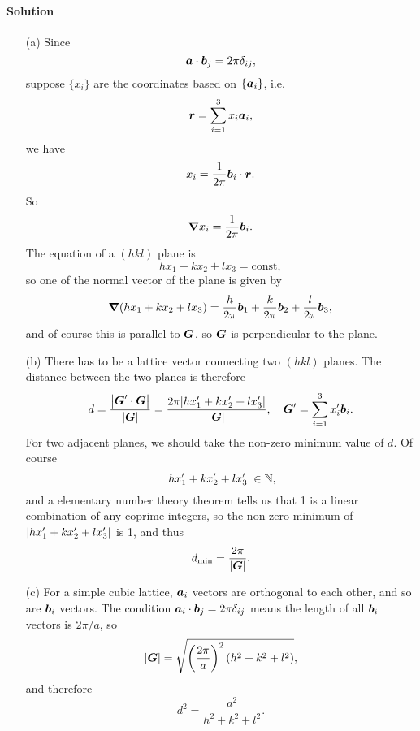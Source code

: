 \documentclass[hyperref, a4paper]{article}
\begin{document}
\paragraph{Solution} 
\begin{itemize}
\item[(a)] Since 
\[
    \vb*{a} \cdot \vb*{b}_j = 2 \pi \delta_{ij},
\]
suppose $\{x_i\}$ are the coordinates based on $\{\vb*{a}_i\}$, i.e. 
\begin{equation}
    \vb*{r} = \sum_{i=1}^3 x_i \vb*{a}_i,
\end{equation}
we have 
\begin{equation}
    x_i = \frac{1}{2\pi} \vb*{b}_i \cdot \vb*{r}.
\end{equation}
So 
\begin{equation}
    \grad{x_i} = \frac{1}{2 \pi} \vb*{b}_i.
\end{equation}
The equation of a $(hkl)$ plane is 
\begin{equation}
    h x_1 + k x_2 + l x_3 = \text{const},
\end{equation}
so one of the normal vector of the plane is given by 
\begin{equation}
    \grad{(h x_1 + k x_2 + l x_3)} = \frac{h}{2\pi} \vb*{b}_1 + \frac{k}{2\pi} \vb*{b}_2 + \frac{l}{2\pi} \vb*{b}_3,
\end{equation}
and of course this is parallel to $\vb*{G}$,
so $\vb*{G}$ is perpendicular to the plane.

\item[(b)] There has to be a lattice vector connecting two $(hkl)$ planes.
The distance between the two planes is therefore 
\begin{equation}
    d = \frac{\abs{\vb*{G}' \cdot \vb*{G}}}{\abs{\vb*{G}}} 
    = \frac{2\pi \abs{h x_1' + k x_2' + l x_3'}}{\abs{\vb*{G}}}, \quad 
    \vb*{G}' = \sum_{i=1}^3 x_i' \vb*{b}_i.
\end{equation}
For two adjacent planes, we should take the non-zero minimum value of $d$.
Of course 
\[
    \abs{h x_1' + k x_2' + l x_3'} \in \mathbb{N},
\]
and a elementary number theory theorem tells us 
that 1 is a linear combination of any coprime integers,
so the non-zero minimum of $\abs{h x_1' + k x_2' + l x_3'}$ is 1,
and thus 
\begin{equation}
    d_{\min} = \frac{2\pi}{\abs{\vb*{G}}}.
\end{equation}

\item[(c)] For a simple cubic lattice, 
$\vb*{a}_i$ vectors are orthogonal to each other,
and so are $\vb*{b}_i$ vectors.
The condition $\vb*{a}_i \cdot \vb*{b}_j = 2\pi \delta_{ij}$ means 
the length of all $\vb*{b}_i$ vectors is $2\pi / a$,
so 
\[
    \abs{\vb*{G}} = \sqrt{ \left(\frac{2\pi}{a}\right)^2 (h^2 + k^2 + l^2) },
\]
and therefore 
\begin{equation}
    d^2 = \frac{a^2}{h^2 + k^2 + l^2}.
\end{equation}

\end{itemize}
\end{document}
